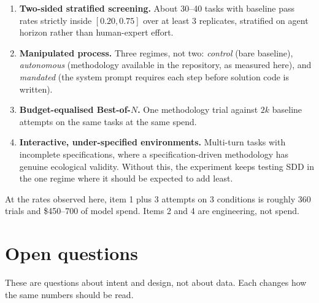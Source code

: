 \documentclass[11pt,a4paper]{article}
\begin{document}
\begin{enumerate}
\item \textbf{Two-sided stratified screening.} About 30--40 tasks with baseline pass rates
      strictly inside $[0.20, 0.75]$ over at least 3 replicates, stratified on agent horizon
      rather than human-expert effort.
\item \textbf{Manipulated process.} Three regimes, not two: \emph{control} (bare baseline),
      \emph{autonomous} (methodology available in the repository, as measured here), and
      \emph{mandated} (the system prompt requires each step before solution code is written).
\item \textbf{Budget-equalised Best-of-$N$.} One methodology trial against $2k$ baseline
      attempts on the same tasks at the same spend.
\item \textbf{Interactive, under-specified environments.} Multi-turn tasks with incomplete
      specifications, where a specification-driven methodology has genuine ecological
      validity. Without this, the experiment keeps testing SDD in the one regime where it
      should be expected to add least.
\end{enumerate}

\noindent At the rates observed here, item 1 plus 3 attempts on 3 conditions is roughly 360
trials and \$450--700 of model spend. Items 2 and 4 are engineering, not spend.

\clearpage
\section{Open questions}
\label{sec:open}

These are questions about intent and design, not about data. Each changes how the same numbers
should be read.
\end{document}
